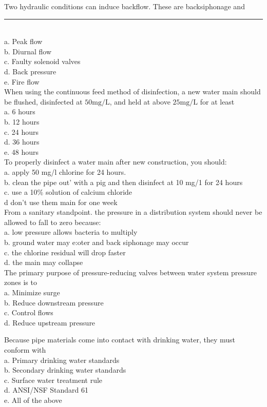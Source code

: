   Two hydraulic conditions can induce backflow. These are backsiphonage and \rule{1.5cm}{0.3mm}\\
a. Peak flow\\
b. Diurnal flow\\
c. Faulty solenoid valves\\
d. Back pressure\\
e. Fire flow\\

When using the continuous feed method of disinfection, a new water main should be flushed, disinfected at $50 \mathrm{mg} / \mathrm{L}$, and held at above $25 \mathrm{mg} / \mathrm{L}$ for at least\\
a. 6 hours\\
b. 12 hours\\
c. 24 hours\\
d. 36  hours\\
e. 48 hours\\

To properly disinfect a water main after new construction, you should:\\
a.	 apply 50 mg/l chlorine for 24 hours.\\
b. 	clean the pipe out' with a pig and then disinfect at 10 mg/1 for 24 hours\\
c.	use a 10\% solution of calcium chloride \\
d	 don't use them main for one week\\

From a sanitary standpoint. the pressure in a distribution system should never be allowed to fall to zero because:\\
a.	low pressure allows bacteria to multiply\\
b.	ground water may e:oter and back siphonage may occur\\
c.	the chlorine residual will drop faster\\
d.	the main may collapse\\

The primary purpose of pressure-reducing valves between water system pressure zones is to\\
a. Minimize surge\\
b. Reduce downstream pressure\\
c. Control flows\\
d. Reduce upstream pressure

Because pipe materials come into contact with drinking water, they must conform with\\
a. Primary drinking water standards\\
b. Secondary drinking water standards\\
c. Surface water treatment rule\\
d. ANSI/NSF Standard 61\\
e. All of the above\\

